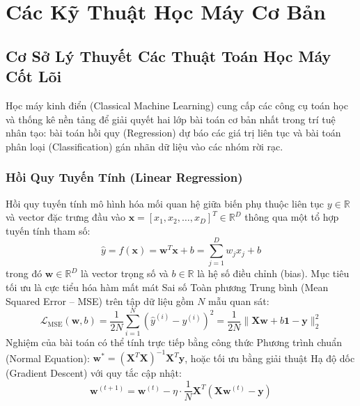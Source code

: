 \documentclass[12pt,a4paper]{report}
\begin{document}
\chapter{Các Kỹ Thuật Học Máy Cơ Bản}

\section{Cơ Sở Lý Thuyết Các Thuật Toán Học Máy Cốt Lõi}

Học máy kinh điển (Classical Machine Learning) cung cấp các công cụ toán học và thống kê nền tảng để giải quyết hai lớp bài toán cơ bản nhất trong trí tuệ nhân tạo: bài toán hồi quy (Regression) dự báo các giá trị liên tục và bài toán phân loại (Classification) gán nhãn dữ liệu vào các nhóm rời rạc.

\subsection{Hồi Quy Tuyến Tính (Linear Regression)}
Hồi quy tuyến tính mô hình hóa mối quan hệ giữa biến phụ thuộc liên tục $y \in \mathbb{R}$ và vector đặc trưng đầu vào $\mathbf{x} = [x_1, x_2, \dots, x_D]^T \in \mathbb{R}^D$ thông qua một tổ hợp tuyến tính tham số:
\begin{equation}
\hat{y} = f(\mathbf{x}) = \mathbf{w}^T \mathbf{x} + b = \sum_{j=1}^D w_j x_j + b
\end{equation}
trong đó $\mathbf{w} \in \mathbb{R}^D$ là vector trọng số và $b \in \mathbb{R}$ là hệ số điều chỉnh (bias). Mục tiêu tối ưu là cực tiểu hóa hàm mất mát Sai số Toàn phương Trung bình (Mean Squared Error -- MSE) trên tập dữ liệu gồm $N$ mẫu quan sát:
\begin{equation}
\mathcal{L}_{\text{MSE}}(\mathbf{w}, b) = \frac{1}{2N} \sum_{i=1}^N \left( \hat{y}^{(i)} - y^{(i)} \right)^2 = \frac{1}{2N} \|\mathbf{X}\mathbf{w} + b\mathbf{1} - \mathbf{y}\|_2^2
\end{equation}
Nghiệm của bài toán có thể tính trực tiếp bằng công thức Phương trình chuẩn (Normal Equation): $\mathbf{w}^* = (\mathbf{X}^T \mathbf{X})^{-1} \mathbf{X}^T \mathbf{y}$, hoặc tối ưu bằng giải thuật Hạ độ dốc (Gradient Descent) với quy tắc cập nhật:
\begin{equation}
\mathbf{w}^{(t+1)} = \mathbf{w}^{(t)} - \eta \cdot \frac{1}{N} \mathbf{X}^T (\mathbf{X}\mathbf{w}^{(t)} - \mathbf{y})
\end{equation}
\end{document}
